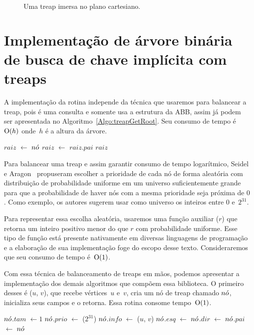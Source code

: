 \begin{figure}[htb]
\centering

\caption{Uma treap imersa no plano cartesiano.}
\label{fig:TREAP}
\end{figure}

\section{Implementação de árvore binária de busca de chave implícita com treaps}
\label{sec:imple-treap}
A implementação da rotina \treapGetRoot{} independe da técnica que usaremos para balancear a treap,
pois é uma consulta e somente usa a estrutura da ABB,
assim já podem ser apresentada no Algoritmo~\ref{Algo:treapGetRoot}.
Seu consumo de tempo é~$\mathrm{O}(h)$ onde~$h$ é a altura da árvore.

\begin{algorithm}[htb]
\caption{\treapGetRoot($\node$)}
\label{Algo:treapGetRoot}
\begin{algorithmic}[1]
\State $raiz$ $\gets$ $\node$
\State  $raiz$ $\gets$  $raiz$.$pai$
\EndWhile
\State \Return $raiz$
\end{algorithmic}
\end{algorithm}

Para balancear uma treap e assim garantir consumo de tempo logarítmico, Seidel e Aragon~\cite{AragonSeidel1996} propuseram escolher a prioridade de cada nó de forma aleatória com distribuição de probabilidade uniforme em um universo suficientemente grande para que a probabilidade de haver nós com a mesma prioridade seja próxima de $0$. Como exemplo, os autores sugerem usar como universo os inteiros entre $0$ e~$2^{31}$.

Para representar essa escolha aleatória, usaremos uma função auxiliar \random($r$) que retorna um inteiro positivo menor do que $r$ com probabilidade uniforme. Esse tipo de função está presente nativamente em diversas linguagens de programação e a elaboração de sua implementação foge do escopo desse texto. Consideraremos que seu consumo de tempo é~$\mathrm{O}(1)$.


Com essa técnica de balanceamento de treaps em mãos, podemos apresentar a implementação dos demais algoritmos que compõem essa biblioteca.
O primeiro desses é \treapCreate($u$, $v$), que recebe vértices~$u$ e~$v$, cria um nó de treap chamado $\node$, inicializa seus campos e o retorna.
Essa rotina consome tempo~$\mathrm{O}(1)$. 

\begin{algorithm}
\caption{\treapCreate($u$, $v$)}
\label{Algo:TREAPbuild}
\begin{algorithmic}[1]
\State $\node$.$tam$ $\gets 1$
\State $\node$.$prio$ $\gets$ \random($2^{31}$)
\State $\node$.$info$ $\gets$ ($u$, $v$)
\State $\node$.$esq$ $\gets$ $\node$.$dir$ $\gets$ $\node$.$pai$ $\gets$ \Nil
\State \Return $\node$
\end{algorithmic}
\end{algorithm}

